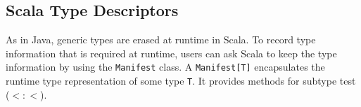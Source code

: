 \subsection{Scala Type Descriptors}

As in Java, generic types are erased at runtime in Scala.
To record type information that is required at runtime, users can ask Scala to 
keep the type information by using the {\tt Manifest} class.  
A {\tt Manifest[T]} encapsulates the runtime type representation 
of some type {\tt T}.  It provides methods for subtype test ($<:<$).

\begin{comment}
\begin{figure}[p]
\begin{lstlisting}[language=scala]
import scala.reflect._

object ManifestExample extends App {
  assert(List(1,2.0,"3").isInstanceOf[List[String]])
  // Compiler Warning :non-variable type argument String in type List[String] is unchecked since it is eliminated by 
  // erasure
  
  case class Foo[A](a: A)
  type F = Foo[_]
  assert(classManifest[F].toString.equals(
            "sample.other.ManifestExample$Foo[<?>]"))
  assert(NoManifest.toString.equals("<?>"))
  
  assert(manifest[List[Int]].toString.equals(
            "scala.collection.immutable.List[Int]"))
  assert(manifest[List[Int]].erasure.toString.equals(
            "class scala.collection.immutable.List"))
  
  def typeName[T](x: T)(implicit m: Manifest[T]): String  = {
    m.toString
  }
  assert(typeName(2).equals("Int"))
    
  def boundTypeName[T:Manifest](x: T):String = {
    manifest[T].toString
  }
  assert(boundTypeName(2).equals("Int"))
  
  def isSubType[T: Manifest, U: Manifest] = manifest[T] <:< manifest[U]
  assert(isSubType[List[String], List[AnyRef]])
  assert(! isSubType[List[String], List[Int]]) 
}
\end{lstlisting}
\caption{Scala Example: Manifest Example}
\label{scala_manifest_example}
\end{figure}
\end{comment}

